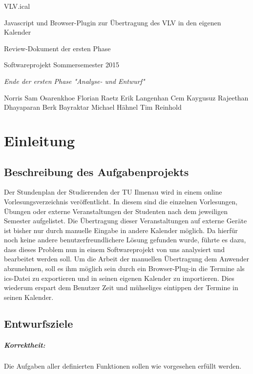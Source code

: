 \documentclass[11pt]{scrreprt}
\begin{document}
\begin{center}
\Huge
VLV.ical

\medskip
\large
Javascript und Browser-Plugin zur \"Ubertragung des VLV in den eigenen Kalender

\vskip 1in
\Large
Review-Dokument der ersten Phase

\large
\vskip 2in
Softwareprojekt Sommersemester 2015

\medskip
\textit{
Ende der ersten Phase "Analyse- und Entwurf"
}
\vskip 3in

\normalsize
\textup{ 
Norris Sam Osarenkhoe \qquad
Florian Raetz \qquad
}
\textup{ 
Erik Langenhan \qquad
Cem Kaygusuz \qquad
}
\textup{ 
Rajeethan Dhayaparan \qquad
Berk Bayraktar \qquad
}
\textup{ 
Michael H\"ahnel \qquad
Tim Reinhold
}
\end{center}

\newpage
\tableofcontents

\newpage
\chapter{Einleitung}

\section{Beschreibung des Aufgabenprojekts}

\normalsize \normalfont \textnormal
Der Stundenplan der Studierenden der TU Ilmenau wird in einem online Vorlesungsverzeichnis veröffentlicht. In diesem sind die einzelnen Vorlesungen, Übungen oder externe Veranstaltungen der Studenten nach dem jeweiligen Semester aufgelistet. Die Übertragung dieser Veranstaltungen auf externe Geräte ist bisher nur durch manuelle Eingabe in andere Kalender möglich. Da hierfür noch keine andere benutzerfreundlichere Lösung gefunden wurde, führte es dazu, dass dieses Problem nun in einem Softwareprojekt von uns analysiert und bearbeitet werden soll.  
Um die Arbeit der manuellen Übertragung dem Anwender abzunehmen, soll es ihm möglich sein durch ein Browser-Plug-in die Termine als ics-Datei zu exportieren und in seinen eigenen Kalender zu importieren. Dies wiederum erspart dem Benutzer Zeit und mühseliges eintippen der Termine in seinen Kalender.

\section{Entwurfsziele}
\paragraph{Korrektheit:} Die Aufgaben aller definierten Funktionen sollen wie vorgesehen erfüllt werden.
\end{document}
